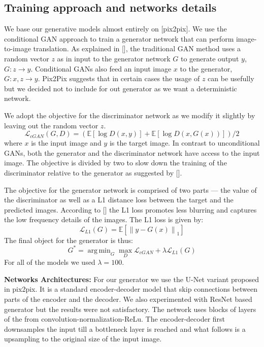 \documentclass{llncs}
\DeclareMathOperator*{\argminA}{arg\,min}
\begin{document}
\subsection{Training approach and networks details}
We base our generative models almost entirely on [pix2pix]. We use the conditional GAN approach to train a generator network that can perform image-to-image translation. As explained in [], the traditional GAN method uses a random vector $z$ as in input to the generator network $G$ to generate output $y$, $G:z \rightarrow y$. Conditional GANs also feed an input image $x$ to the generator, $G: x,z \rightarrow y$. Pix2Pix suggests that in certain cases the usage of $z$ can be usefully but we decided not to include for out generator as we want a deterministic network.

We adopt the objective for the discriminator network as we modify it slightly by leaving out the random vector $z$.
\begin{equation}
\mathcal{L}_{cGAN} (G, D) = (\mathbb{E}[\log D (x,y)] + \mathbb{E}[\log D (x, G(x))])/2
\end{equation}
where $x$ is the input image and $y$ is the target image. In contrast to unconditional GANs, both the generator and the discriminator network have access to the input image. The objective is divided by two to slow down the training of the discriminator relative to the generator as suggested by [].

The objective for the generator network is comprised of two parts --- the value of the discriminator as well as a L1 distance loss between the target and the predicted images. According to [] the L1 loss promotes less blurring and captures the low frequency details of the images. The L1 loss is given by:
\begin{equation}
\mathcal{L}_{L1} (G) = \mathbb{E}[\left\lVert y - G(x)\right\rVert_1]
\end{equation}
The final object for the generator is thus:
\begin{equation}
G^* = \argminA_G \max_D \mathcal{L}_{cGAN}  + \lambda \mathcal{L}_{L1} (G)
\end{equation}
For all of the models we used $\lambda = 100$.

\noindent\textbf{Networks Architectures:} For our generator we use the U-Net variant proposed in pix2pix. It is a standard encoder-decoder model that skip connections between parts of the encoder and the decoder. We also experimented with ResNet based generator but the results were not satisfactory. The network uses blocks of layers of the from convolution-normalization-ReLu. The encoder-decoder first downsamples the input till a bottleneck layer is reached and what follows is a upsampling to the original size of the input image.
\end{document}
